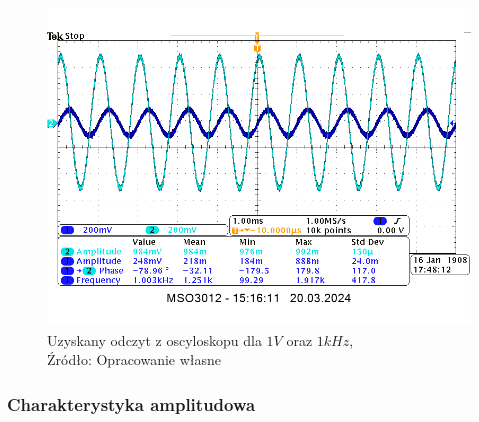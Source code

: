 \documentclass{article}
\begin{document}
        \begin{figure}[!ht]
          \centering
          \includegraphics[scale=0.45]{grafiki/1kHz.png}
          \caption{Uzyskany odczyt z oscyloskopu dla $1V$ oraz $1kHz$,
              \\Źródło: Opracowanie własne}
        \end{figure}
        \pagebreak

      \subsubsection{Charakterystyka amplitudowa}
\end{document}
